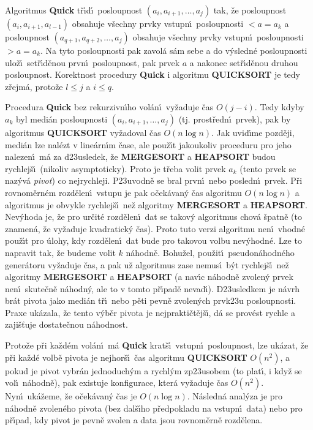 \flushpar Algoritmus {\bf Quick} t\v r\'\i d\'\i\ posloupnost 
$(a_i,a_{i+1},\dots,a_j)$ tak, \v ze posloupnost $(a_i,a_{i+1}
,a_{l-1})$ obsahuje v\v sechny prvky vstupn\'\i\ posloupnosti $<a=a_k$ a  
posloupnost $(a_{q+1},a_{q+2},\dots,a_j)$ obsahuje v\v sechny prvky 
vstupn\'\i\ posloupnosti $>a=a_k$. Na tyto posloupnosti pak 
zavol\'a s\'am sebe a do v\'ysledn\'e posloupnosti ulo\v z\'\i\ 
set\v r\'\i d\v enou prvn\'\i\ posloupnost, pak prvek $a$ a nakonec 
set\v r\'\i d\v enou druhou posloupnost. Korektnost procedury 
{\bf Quick}  i algoritmu {\bf QUICKSORT} je tedy z\v rejm\'a, proto\v ze 
$l\le j$ a $i\le q$. 
\medskip

\flushpar Procedura {\bf Quick} bez rekurzivn\'\i ho vol\'an\'\i\ 
vy\v zaduje \v cas $O(j-i)$. Tedy kdyby $a_k$ byl medi\'an 
posloupnosti $(a_i,a_{i+1},\dots,a_j)$ (tj. prost\v redn\'\i\ prvek), pak 
by algoritmus {\bf QUICKSORT} vy\-\v zadoval \v cas $O(n\log n)$. Jak 
uvid\'\i me pozd\v eji, medi\'an lze nal\'ezt v line\'ar\-n\'\i m \v case, ale 
pou\v z\'\i t jakoukoliv proceduru pro jeho nalezen\'\i\ m\'a za 
d\accent23usledek, \v ze {\bf MERGESORT} a {\bf HEAPSORT }
budou rychlej\v s\'\i\ (nikoliv asymptoticky). Proto je t\v reba 
volit prvek $a_k$ (tento prvek se naz\'yv\'a \emph{pivot}) co 
nejrychleji. P\accent23uvodn\v e se bral prvn\'\i\ nebo 
posledn\'\i\ prvek. P\v ri rovnom\v ern\'em rozd\v elen\'\i\ vstupu je 
pak o\v cek\'avan\'y \v cas algoritmu $O(n\log n)$ a algoritmus je 
obvykle rychlej\v s\'\i\ ne\v z algoritmy {\bf MERGESORT} a 
{\bf HEAPSORT}. Nev\'yhoda je, \v ze pro ur\v cit\'e rozd\v elen\'\i\ dat se 
takov\'y algoritmus chov\'a \v spatn\v e (to znamen\'a, \v ze 
vy\v zaduje kvadra\-tick\'y \v cas). Proto tuto 
verzi algoritmu nen\'\i\ vhodn\'e pou\v z\'\i t pro \'ulohy, kdy 
rozd\v elen\'\i\ dat bude pro takovou volbu nev\'yhodn\'e. 
Lze to napravit tak, \v ze budeme volit $k$ n\'ahodn\v e. Bohu\v zel, 
pou\v zit\'\i\ pseudon\'ahodn\'eho gener\'atoru vy\v zaduje \v cas, a pak 
u\v z algoritmus zase nemus\'\i\ b\'yt rychlej\v s\'\i\ ne\v z algoritmy 
{\bf MERGESORT} a {\bf HEAPSORT} (a nav\'\i c n\'ahodn\v e zvolen\'y 
prvek nen\'\i\ skute\v cn\v e n\'ahodn\'y, ale to v tomto p\v r\'\i pad\v e 
nevad\'\i ). D\accent23usledkem je n\'avrh br\'at pivota jako 
medi\'an t\v r\'\i\ nebo p\v eti pevn\v e zvolen\'ych prvk\accent23u 
posloupnosti. Praxe uk\'azala, \v ze tento v\'yb\v er pivota je 
nej\-prakti\v ct\v ej\v s\'\i , d\'a se prov\'est rychle a zaji\v s\v tuje 
dostate\v cnou n\'a\-hod\-nost.
\medskip

\flushpar Proto\v ze p\v ri ka\v zd\'em vol\'an\'\i\ m\'a {\bf Quick} krat\v s\'\i\ 
vstupn\'\i\ posloupnost, lze uk\'azat, \v ze p\v ri ka\v zd\'e volb\v e 
pivota je nejhor\v s\'\i\ \v cas algoritmu {\bf QUICKSORT} $O(n^2
)$, a 
pokud je pivot vybr\'an jedno\-du\-ch\'ym a rychl\'ym 
zp\accent23usobem (to plat\'\i , i kdy\v z se vol\'\i\ n\'ahodn\v e), pak 
exi\-stuje konfigurace, kter\'a vy\v zaduje \v cas $O(n^2)$. Nyn\'\i\ 
uk\'a\-\v zeme, \v ze o\v cek\'avan\'y \v cas je $O(n\log n)$. N\'asledn\'a anal\'y\-za 
je pro n\'a\-hod\-n\v e zvolen\'eho pivota (bez dal\v s\'\i ho p\v redpokladu na 
vstupn\'\i\ data) nebo pro p\v r\'\i pad, kdy pivot je pevn\v e zvolen a data 
jsou rovno\-m\v ern\v e rozd\v e\-lena.
\medskip

